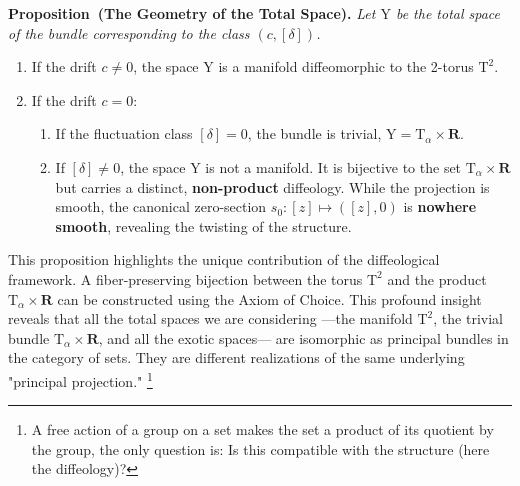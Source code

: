 \documentclass[10pt,letterpaper,reqno]{amsart}
\newenvironment{proposition}[1]%
{\noindent\textbf{Proposition#1.} \it}%
{}
\newcommand{\RR}{\mathbf{R}}
\newcommand{\T}{\mathrm{T}}
\newcommand{\Y}{\mathrm{Y}}
\newcommand{\cl}[1]{\left[ #1 \right]}
\begin{document}
  \begin{proposition}{~(The Geometry of the Total Space)}
    Let $\Y$ be the total space of the bundle corresponding to the class $(c, \cl{\delta})$.
    \begin{enumerate}
      \item If the drift $c \neq 0$,
      the space $\Y$ is a manifold diffeomorphic to the 2-torus $\T^2$.
      \item If the drift $c = 0$:
      \begin{enumerate}
        \item If the fluctuation class $\cl{\delta}=0$,
        the bundle is trivial, $\Y = \T_\alpha \times \RR$.
        \item If $\cl{\delta} \neq 0$, the space $\Y$ is not a manifold.
        It is bijective to the set $\T_\alpha \times \RR$ but carries a distinct, \textbf{non-product} diffeology.
        While the projection is smooth, the canonical zero-section $s_0: \cl{z} \mapsto (\cl{z}, 0)$ is \textbf{nowhere smooth}, revealing the twisting of the structure.
      \end{enumerate}
    \end{enumerate}
    \end{proposition}
    
    This proposition highlights the unique contribution of the diffeological framework.
    A fiber-preserving bijection between the torus $\T^2$ and the product $\T_\alpha \times \RR$ can be constructed using the Axiom of Choice.
    This profound insight reveals that all the total spaces we are considering
    ---the manifold $\T^2$, the trivial bundle $\T_\alpha \times \RR$,
    and all the exotic spaces---
    are isomorphic as principal bundles in the category of sets.
    They are different realizations of the same underlying "principal projection."%
    \footnote{A free action of a group on a set makes the set a product of its quotient by the group,
    the only question is: Is this compatible with the structure (here the diffeology)?}
    
\end{document}
